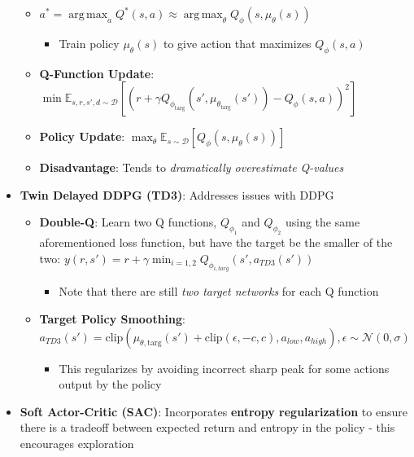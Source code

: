 \documentclass{article}
\providecommand{\tightlist}{%
  \setlength{\itemsep}{\GlobalItemSep}\setlength{\parskip}{\GlobalListParSkip}}
\newlength{\GlobalItemSep}
\newlength{\GlobalListParSkip}
\DeclareMathOperator*{\argmax}{arg\,max}
\begin{document}
\begin{multicols}{2}
\begin{itemize}
  \begin{itemize}
  \tightlist
  \item
    \(a^* = \argmax_a Q^* (s, a) \approx \argmax_\theta Q_\phi (s, \mu_\theta(s))\)

    \begin{itemize}
    \tightlist
    \item
      Train policy \(\mu_\theta(s)\) to give action that maximizes
      \(Q_\phi(s,a)\)
    \end{itemize}
  \item
    \textbf{Q-Function Update}:
    \(\min \mathbb{E}_{s, r, s', d \sim \mathcal{D}}[(r + \gamma Q_{\phi_{\text{targ}}}(s', \mu_{\theta_{\text{targ}}}(s')) - Q_\phi (s,a))^2]\)
  \item
    \textbf{Policy Update}:
    \(\max_\theta \mathbb{E}_{s \sim \mathcal{D}}[Q_\phi (s, \mu_\theta(s))]\)
  \item
    \textbf{Disadvantage}: Tends to \emph{dramatically overestimate
    Q-values}
  \end{itemize}
\item
  \textbf{Twin Delayed DDPG (TD3)}: Addresses issues with DDPG

  \begin{itemize}
  \tightlist
  \item
    \textbf{Double-Q}: Learn two Q functions, \(Q_{\phi_1}\) and
    \(Q_{\phi_2}\) using the same aforementioned loss function, but have
    the target be the smaller of the two:
    \(y(r, s') = r + \gamma \min_{i=1,2} Q_{\phi_{i, targ}} (s', a_{TD3}(s'))\)

    \begin{itemize}
    \tightlist
    \item
      Note that there are still \emph{two target networks} for each Q
      function
    \end{itemize}
  \item
    \textbf{Target Policy Smoothing}:
    \(a_{TD3}(s') = \text{clip}(\mu_{\theta, \text{targ}}(s') + \text{clip}(\epsilon, -c, c), a_{low}, a_{high}), \epsilon \sim \mathcal{N}(0, \sigma)\)

    \begin{itemize}
    \tightlist
    \item
      This regularizes by avoiding incorrect sharp peak for some actions
      output by the policy
    \end{itemize}
  \end{itemize}
\item
  \textbf{Soft Actor-Critic (SAC)}: Incorporates \textbf{entropy
  regularization} to ensure there is a tradeoff between expected return
  and entropy in the policy - this encourages exploration


\end{itemize}
\end{multicols}
\end{document}
